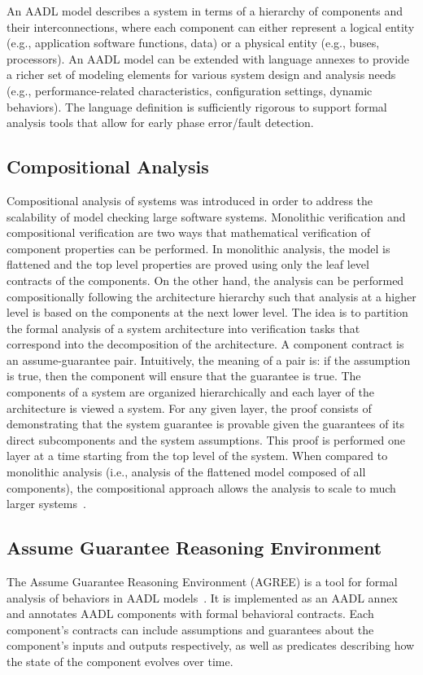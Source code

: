 An AADL model describes a system in terms of a hierarchy of components and their interconnections, where each component can either represent a logical entity (e.g., application software functions, data) or a physical entity (e.g., buses, processors). An AADL model can be extended with language annexes to provide a richer set of modeling elements for various system design and analysis needs (e.g., performance-related characteristics, configuration settings, dynamic behaviors). The language definition is sufficiently rigorous to support formal analysis tools that allow for early phase error/fault detection.

\subsection{Compositional Analysis} Compositional analysis of systems was introduced in order to address the scalability of model checking large software systems. Monolithic verification and compositional verification are two ways that mathematical verification of component properties can be performed. In monolithic analysis, the model is flattened and the top level properties are proved using only the leaf level contracts of the components. On the other hand, the analysis can be performed compositionally following the architecture hierarchy such that analysis at a higher level is based on the components at the next lower level. The idea is to partition the formal analysis of a system architecture into verification tasks that correspond into the decomposition of the architecture. A component contract is an assume-guarantee pair. Intuitively, the meaning of a pair is: if the assumption is true, then the component will ensure that the guarantee is true. The components of a system are organized hierarchically and each layer of the architecture is viewed a system. For any given layer, the proof consists of demonstrating that the system guarantee is provable given the guarantees of its direct subcomponents and the system assumptions. This proof is performed one layer at a time starting from the top level of the system. When compared to monolithic analysis (i.e., analysis of the flattened model composed of all components), the compositional approach allows the analysis to scale to much larger systems~\cite{NFM2012:CoGaMiWhLaLu}. 

\subsection{Assume Guarantee Reasoning Environment}
The Assume Guarantee Reasoning Environment (AGREE) is a tool for formal analysis of behaviors in AADL models~\cite{NFM2012:CoGaMiWhLaLu}.  It is implemented as an AADL annex and annotates AADL components with formal behavioral contracts. Each component's contracts can include assumptions and guarantees about the component's inputs and outputs respectively, as well as predicates describing how the state of the component evolves over time.

